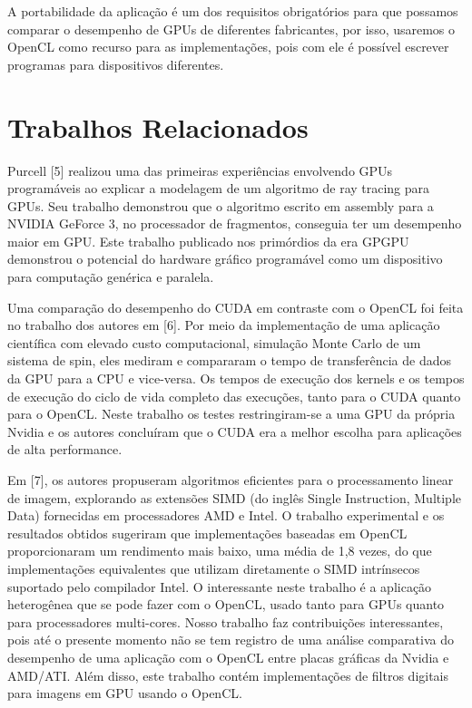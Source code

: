A portabilidade da aplicação é um dos requisitos obrigatórios para que possamos comparar o desempenho de GPUs de diferentes fabricantes, por isso, usaremos o OpenCL como recurso para as implementações, pois com ele é possível escrever programas para dispositivos diferentes.


\section{Trabalhos Relacionados}

Purcell [5] realizou uma das primeiras experiências envolvendo GPUs programáveis ao explicar a modelagem de um algoritmo de  ray tracing  para GPUs. Seu trabalho demonstrou que o algoritmo escrito em  assembly  para a  NVIDIA GeForce 3,  no processador de fragmentos, conseguia ter um desempenho maior em GPU. Este trabalho publicado nos primórdios da era GPGPU demonstrou o  potencial do hardware gráfico programável como um dispositivo para computação genérica e paralela.

Uma comparação do desempenho do CUDA em contraste com o OpenCL foi feita no trabalho dos autores em [6]. Por meio da implementação de uma aplicação científica com elevado custo computacional, simulação Monte Carlo de um sistema de spin, eles mediram e compararam o tempo de transferência de dados da GPU para a CPU e vice-versa. Os tempos de execução dos kernels e os tempos de execução do ciclo de vida completo das execuções, tanto para o CUDA quanto para o OpenCL. Neste trabalho os testes restringiram-se a uma GPU da própria Nvidia e os autores concluíram que o CUDA era a melhor escolha para aplicações de alta performance.

Em [7], os autores propuseram algoritmos eficientes para o processamento linear de imagem, explorando as extensões SIMD (do inglês Single Instruction, Multiple Data) fornecidas em processadores AMD e Intel. O trabalho experimental e os resultados obtidos sugeriram que implementações baseadas em OpenCL proporcionaram um rendimento mais baixo, uma média de 1,8 vezes, do que implementações equivalentes que utilizam diretamente o SIMD intrínsecos suportado pelo compilador Intel. O interessante neste trabalho é a aplicação heterogênea que se pode fazer com o OpenCL, usado tanto para GPUs quanto para processadores multi-cores.
Nosso trabalho faz contribuições interessantes, pois até o presente momento não se tem registro de uma análise comparativa do desempenho de uma aplicação com o OpenCL entre placas gráficas da Nvidia e AMD/ATI. Além disso, este trabalho contém implementações de filtros digitais para imagens em GPU usando o OpenCL.

